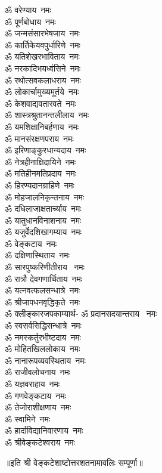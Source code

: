 \begin{multicols}{2}
\begin{flushleft}
        ॐ वरेण्याय~नमः\\
        ॐ पूर्णबोधाय~नमः\\
        ॐ जन्मसंसारभेषजाय~नमः\\
        ॐ कार्तिकेयवपुर्धारिणे~नमः\\
        ॐ यतिशेखरभाविताय~नमः\\
        ॐ नरकादिभयध्वंसिने~नमः\\
        ॐ रथोत्सवकलाधराय~नमः\\
        ॐ लोकार्चामुख्यमूर्तये~नमः\\
        ॐ केशवाद्यवतारवते~नमः\hfill{}\\
                                                        
        ॐ शास्त्रश्रुतानन्तलीलाय~नमः\\
        ॐ यमशिक्षानिबर्हणाय~नमः\\
        ॐ मानसंरक्षणपराय~नमः\\
        ॐ इरिणाङ्कुरधान्यदाय~नमः\\
        ॐ नेत्रहीनाक्षिदायिने~नमः\\
        ॐ मतिहीनमतिप्रदाय~नमः\\
        ॐ हिरण्यदानग्राहिणे~नमः\\
        ॐ मोहजालनिकृन्तनाय~नमः\\
        ॐ दधिलाजाक्षतार्च्याय~नमः\\
        ॐ यातुधानविनाशनाय~नमः\hfill{}\\
                                                        
        ॐ यजुर्वेदशिखागम्याय~नमः\\
        ॐ वेङ्कटाय~नमः\\
        ॐ दक्षिणास्थिताय~नमः\\
        ॐ सारपुष्करिणीतीराय ~नमः\\
        ॐ रात्रौ  देवगणार्चिताय~नमः\\
        ॐ यत्नवत्फलसन्धात्रे~नमः\\
        ॐ श्रीजापधनवृद्धिकृते~नमः\\
        ॐ क्लीङ्कारजपकाम्यार्थ-
        ॐ प्रदानसदयान्तराय ~नमः\\
        ॐ स्वसर्वसिद्धिसन्धात्रे~नमः\\
        ॐ नमस्कर्तुरभीष्टदाय~नमः\hfill{}\\
        
        ॐ मोहितखिललोकाय~नमः\\
        ॐ नानारूपव्यवस्थिताय~नमः\\
        ॐ राजीवलोचनाय~नमः\\
        ॐ यज्ञवराहाय~नमः\\
        ॐ गणवेङ्कटाय~नमः\\
        ॐ तेजोराशीक्षणाय~नमः\\
        ॐ स्वामिने~नमः\\
        ॐ हार्दाविद्यानिवारणाय~नमः\hfill{}\\
        ॐ श्रीवेङ्कटेश्वराय~नमः\\
    \end{flushleft}
\end{multicols}
॥इति श्री वेङ्कटेशाष्टोत्तरशतनामावलिः सम्पूर्णा॥
